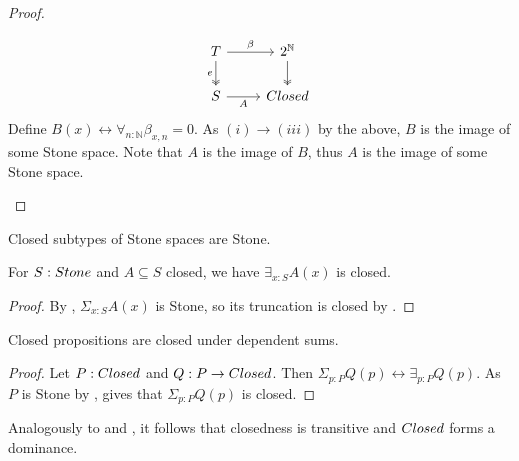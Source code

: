 \begin{proof}
\begin{itemize}
     \[
       \begin{tikzcd}
         T \arrow[r,"\beta"] \arrow[d, two heads,swap,"e"] & 2^\mathbb N 
         \arrow[d,two heads] \\
         S \arrow[r,swap,"A"] & \Closed
       \end{tikzcd} 
     \] 
     Define $B(x) \leftrightarrow \forall_{n:\mathbb N} \beta_{x,n} = 0$. 
     As $(i) \to (iii)$ by the above, $B$ is the image of some Stone space. 
     Note that $A$ is the image of $B$, 
     thus $A$ is the image of some Stone space. 
     \end{itemize} 
     \end{proof} 

\begin{corollary}\label{ClosedInStoneIsStone}
Closed subtypes of Stone spaces are Stone.
\end{corollary}

\begin{corollary}\label{InhabitedClosedSubSpaceClosed}
  For $S:\Stone$ and $A\subseteq S$ closed, we have 
  $\exists_{x:S} A(x)$ is closed. 
\end{corollary}
\begin{proof}
  By , $\Sigma_{x:S}A(x)$ is Stone, 
  so its truncation is closed by .
\end{proof}

\begin{corollary}\label{ClosedDependentSums}
  Closed propositions are closed under dependent sums. 
\end{corollary}
\begin{proof}
  Let $P:\Closed$ and $Q:P \to \Closed$. 
  Then $\Sigma_{p:P} Q(p) \leftrightarrow \exists_{p:P} Q(p)$.
  As $P$ is Stone by , 
   gives that $\Sigma_{p:P} Q(p)$ is closed. 
\end{proof}
\begin{remark}\label{ClosedDominance}\label{ClosedTransitive}
  Analogously to  and , it follows that 
  closedness is transitive and $\Closed$ forms a dominance. 
\end{remark}



